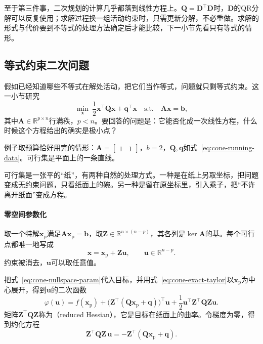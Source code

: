 至于第三件事，二次规划的计算几乎都落到线性方程上。$\bm{Q}=\bm{D}^\top\bm{D}$时，$\bm{D}$的QR分解可以反复使用；求解过程换一组活动约束时，只需更新分解，不必重做。求解的形式与代价要到不等式的处理方法确定后才能比较，下一小节先看只有等式的情形。

\subsection{等式约束二次问题}
\label{sec:cone-equality-qp}

假如已经知道哪些不等式在解处活动，把它们当作等式，问题就只剩等式约束。这一小节研究
\begin{equation}
 \min_{\bm{x}}\ \frac12\bm{x}^\top\bm{Q}\bm{x}+\bm{q}^\top\bm{x}\quad\text{s.t.}\quad\bm{A}\bm{x}=\bm{b},
 \label{eq:cone-eqp}
\end{equation}
其中$\bm{A}\in\mathbb{R}^{p\times n}$行满秩，$p<n$。要回答的问题是：它能否化成一次线性方程，什么时候这个方程给出的确实是极小点？

例子取预算恰好用完的情形：$\bm{A}=\begin{bmatrix}1&1\end{bmatrix}$，$b=2$，$\bm{Q},\bm{q}$如式~\eqref{eq:cone-running-data}。可行集是平面上的一条直线。

可行集是一张平的“纸”，有两种自然的处理方式。一种是在纸上另取坐标，把问题变成无约束问题，只看纸面上的碗。另一种是留在原坐标里，引入乘子，把“不许离开纸面”变成方程。

\paragraph{零空间参数化}
取一个特解$\bm{x}_{\mathrm{p}}$满足$\bm{A}\bm{x}_{\mathrm{p}}=\bm{b}$，取$\bm{Z}\in\mathbb{R}^{n\times(n-p)}$，其各列是$\ker\bm{A}$的基。每个可行点都唯一地写成
\begin{equation}
 \bm{x}=\bm{x}_{\mathrm{p}}+\bm{Z}\bm{u},\qquad\bm{u}\in\mathbb{R}^{n-p}.
 \label{eq:cone-nullspace-param}
\end{equation}
约束被消去，$\bm{u}$可以取任意值。

把式~\eqref{eq:cone-nullspace-param}代入目标，并用式~\eqref{eq:cone-exact-taylor}以$\bm{x}_{\mathrm{p}}$为中心展开，得到$\bm{u}$的二次函数
\begin{equation}
 \varphi(\bm{u})=f(\bm{x}_{\mathrm{p}})+\bigl(\bm{Z}^\top(\bm{Q}\bm{x}_{\mathrm{p}}+\bm{q})\bigr)^\top\bm{u}+\frac12\bm{u}^\top\bm{Z}^\top\bm{Q}\bm{Z}\bm{u}.
 \label{eq:cone-reduced-objective}
\end{equation}
矩阵$\bm{Z}^\top\bm{Q}\bm{Z}$称为（reduced Hessian），它是目标在纸面上的曲率。令梯度为零，得到约化方程
\begin{equation}
 \bm{Z}^\top\bm{Q}\bm{Z}\,\bm{u}=-\bm{Z}^\top(\bm{Q}\bm{x}_{\mathrm{p}}+\bm{q}).
 \label{eq:cone-reduced-equation}
\end{equation}


